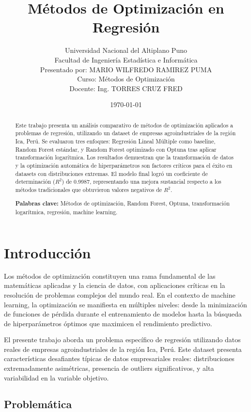 \documentclass[12pt,a4paper]{article}
\title{\textbf{Métodos de Optimización en Regresión}}
\author{
Universidad Nacional del Altiplano Puno \\
Facultad de Ingeniería Estadística e Informática \\
Presentado por: MARIO WILFREDO RAMIREZ PUMA\\
Curso: Métodos de Optimización\\
Docente: Ing. TORRES CRUZ FRED  }
\date{\today}
\begin{document}
\maketitle

\begin{abstract}
Este trabajo presenta un análisis comparativo de métodos de optimización aplicados a problemas de regresión, utilizando un dataset de empresas agroindustriales de la región Ica, Perú. Se evaluaron tres enfoques: Regresión Lineal Múltiple como baseline, Random Forest estándar, y Random Forest optimizado con Optuna tras aplicar transformación logarítmica. Los resultados demuestran que la transformación de datos y la optimización automática de hiperparámetros son factores críticos para el éxito en datasets con distribuciones extremas. El modelo final logró un coeficiente de determinación ($R^2$) de 0.9987, representando una mejora sustancial respecto a los métodos tradicionales que obtuvieron valores negativos de $R^2$.

\textbf{Palabras clave:} Métodos de optimización, Random Forest, Optuna, transformación logarítmica, regresión, machine learning.
\end{abstract}

\tableofcontents
\newpage

\section{Introducción}

Los métodos de optimización constituyen una rama fundamental de las matemáticas aplicadas y la ciencia de datos, con aplicaciones críticas en la resolución de problemas complejos del mundo real. En el contexto de machine learning, la optimización se manifiesta en múltiples niveles: desde la minimización de funciones de pérdida durante el entrenamiento de modelos hasta la búsqueda de hiperparámetros óptimos que maximicen el rendimiento predictivo.

El presente trabajo aborda un problema específico de regresión utilizando datos reales de empresas agroindustriales de la región Ica, Perú. Este dataset presenta características desafiantes típicas de datos empresariales reales: distribuciones extremadamente asimétricas, presencia de outliers significativos, y alta variabilidad en la variable objetivo.

\subsection{Problemática}
\end{document}
